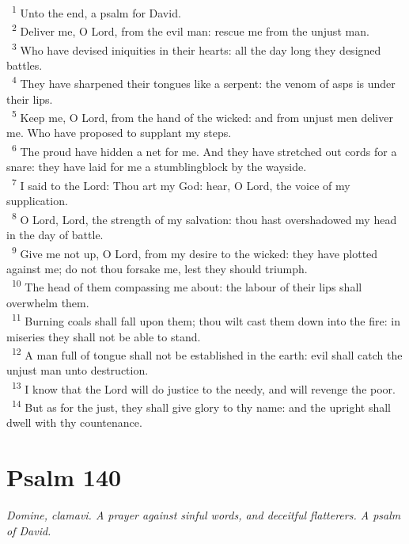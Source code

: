 \documentclass[a5paper,12pt]{article}
\begin{document}
\begin{multicols*}{2}
~\textsuperscript{1} Unto the end, a psalm for David.\\
~\textsuperscript{2} Deliver me, O Lord, from the evil man: rescue me from the unjust man.\\
~\textsuperscript{3} Who have devised iniquities in their hearts: all the day long they designed battles.\\
~\textsuperscript{4} They have sharpened their tongues like a serpent: the venom of asps is under their lips.\\
~\textsuperscript{5} Keep me, O Lord, from the hand of the wicked: and from unjust men deliver me. Who have proposed to supplant my steps.\\
~\textsuperscript{6} The proud have hidden a net for me. And they have stretched out cords for a snare: they have laid for me a stumblingblock by the wayside.\\
~\textsuperscript{7} I said to the Lord: Thou art my God: hear, O Lord, the voice of my supplication.\\
~\textsuperscript{8} O Lord, Lord, the strength of my salvation: thou hast overshadowed my head in the day of battle.\\
~\textsuperscript{9} Give me not up, O Lord, from my desire to the wicked: they have plotted against me; do not thou forsake me, lest they should triumph.\\
~\textsuperscript{10} The head of them compassing me about: the labour of their lips shall overwhelm them.\\
~\textsuperscript{11} Burning coals shall fall upon them; thou wilt cast them down into the fire: in miseries they shall not be able to stand.\\
~\textsuperscript{12} A man full of tongue shall not be established in the earth: evil shall catch the unjust man unto destruction.\\
~\textsuperscript{13} I know that the Lord will do justice to the needy, and will revenge the poor.\\
~\textsuperscript{14} But as for the just, they shall give glory to thy name: and the upright shall dwell with thy countenance.\\

\section{Psalm 140}
\label{sec:org0f1edb6}
\emph{Domine, clamavi. A prayer against sinful words, and deceitful flatterers. A psalm of David.}\\


\end{multicols*}
\end{document}
